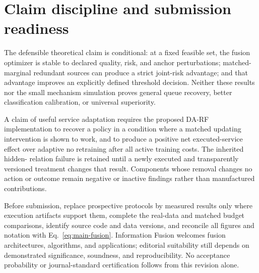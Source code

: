 \section{Claim discipline and submission readiness}

The defensible theoretical claim is conditional: at a fixed feasible set, the
fusion optimizer is stable to declared quality, risk, and anchor perturbations;
matched-marginal redundant sources can produce a strict joint-risk advantage;
and that advantage improves an explicitly defined threshold decision.
Neither these results nor the small mechanism simulation proves general queue
recovery, better classification calibration, or universal superiority.

A claim of useful service adaptation requires the proposed DA-RF implementation
to recover a policy in a condition where a matched updating intervention is
shown to work, and to produce a positive net executed-service effect over
adaptive no retraining after all active training costs. The inherited hidden-
relation failure is retained until a newly executed and transparently versioned
treatment changes that result. Components whose removal changes no action or
outcome remain negative or inactive findings rather than manufactured
contributions.

Before submission, replace prospective protocols by measured results only
where execution artifacts support them, complete the real-data and matched
budget comparisons, identify source code and data versions, and reconcile all
figures and notation with Eq.~\eqref{eq:main-fusion}. Information Fusion welcomes
fusion architectures, algorithms, and applications; editorial suitability
still depends on demonstrated significance, soundness, and reproducibility.
No acceptance probability or journal-standard certification follows from this
revision alone.

